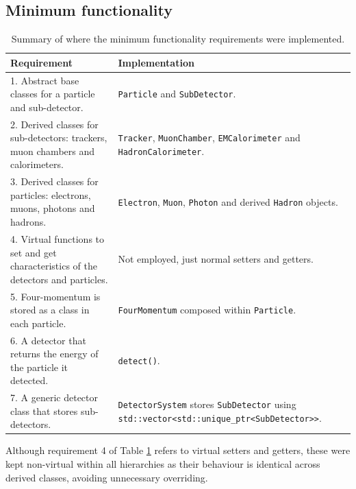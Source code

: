 \documentclass{article}
\begin{document}
\subsection{Minimum functionality}
\begin{table}[H]
    \centering
    \caption{Summary of where the minimum functionality requirements were implemented.}
    \label{tab:min_func_summary}
    \begin{tabularx}{\textwidth}{|X|X|}
        \hline
        \textbf{Requirement} & \textbf{Implementation} \\
        \hline
        
        1. Abstract base classes for a particle and sub-detector.
        & \texttt{Particle} and \texttt{SubDetector}.\\
        \hline
        
        2. Derived classes for sub-detectors: trackers, muon chambers and calorimeters.
        & \texttt{Tracker}, \texttt{MuonChamber},
        \texttt{EMCalorimeter} and
        \texttt{HadronCalorimeter}.
        \\
        \hline
        
        3. Derived classes for particles: electrons, muons, photons and hadrons.
        & \texttt{Electron}, \texttt{Muon}, \texttt{Photon} and derived \texttt{Hadron} objects. \\
        \hline
        
        4. Virtual functions to set and get characteristics of the detectors and particles.
        & Not employed, just normal setters and getters. \\
        \hline
        
        5. Four-momentum is stored as a class in each particle.
        & \texttt{FourMomentum} composed within \texttt{Particle}. \\
        \hline
        
        6. A detector that returns the energy of the particle it detected.
        & \texttt{detect()}.\\
        \hline
        
        7. A generic detector class that stores sub-detectors.
        & \texttt{DetectorSystem} stores \texttt{SubDetector} using \texttt{std::vector<std::unique\_ptr<SubDetector>>}. \\
        \hline
    \end{tabularx}
\end{table}
Although requirement 4 of Table \ref{tab:min_func_summary} refers to virtual setters and getters, these were kept non-virtual within all hierarchies as their behaviour is identical across derived classes, avoiding unnecessary overriding.
\end{document}
